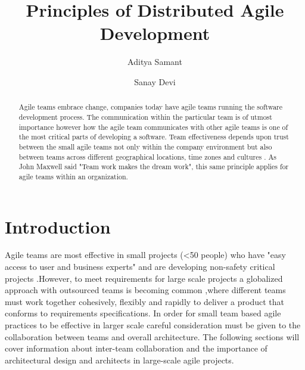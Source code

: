 \documentclass[sigplan,screen]{acmart}
\begin{document}
\title{Principles of Distributed Agile Development}
\author{Aditya Samant}
\author{Sanay Devi}


\begin{abstract}
Agile teams embrace change, companies today have agile teams running the software development process. The communication within the particular team is of utmost importance however how the agile team communicates with other agile teams is one of the most critical parts of developing a software. Team effectiveness depends upon trust between the small agile teams not only within the company environment but also between teams across different geographical locations, time zones and cultures \cite{Siva13}. As John Maxwell said "Team work makes the dream work", this same principle applies for agile teams within an organization.
\end{abstract}

\maketitle



\section{Introduction}
Agile teams are most effective in small projects (<50 people) who have "easy access to user and business experts" and are developing non-safety critical projects \cite{Dingsoyr} .However, to meet requirements for large scale projects a globalized approach with outsourced teams is becoming common \cite{Jeff},where different teams must work together cohesively, flexibly and rapidly to deliver  a product that conforms to requirements specifications. In order for small team based agile practices to be effective in larger scale careful consideration must be given to the collaboration between teams and overall architecture. The following sections will cover information about inter-team collaboration and the importance of architectural design and architects in large-scale agile projects. 
 
 
\end{document}
